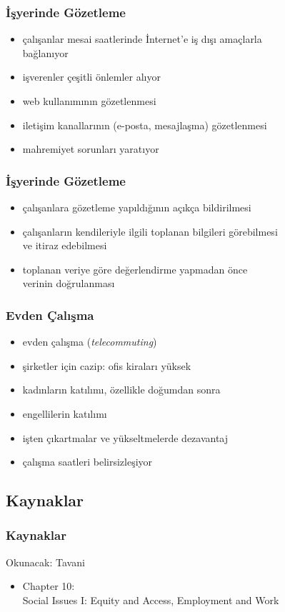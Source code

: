 \documentclass[dvipsnames]{beamer}
\theoremstyle{plain}
\begin{document}
\begin{frame}
  \frametitle{İşyerinde Gözetleme}

  \begin{itemize}
    \item çalışanlar mesai saatlerinde İnternet'e iş dışı amaçlarla\\
      bağlanıyor

    \medskip
    \item işverenler çeşitli önlemler alıyor
    \smallskip
    \item web kullanımının gözetlenmesi
    \item iletişim kanallarının (e-posta, mesajlaşma) gözetlenmesi
    \item mahremiyet sorunları yaratıyor
  \end{itemize}
\end{frame}

\begin{frame}
  \frametitle{İşyerinde Gözetleme}

  \begin{itemize}
    \item çalışanlara gözetleme yapıldığının açıkça bildirilmesi
    \item çalışanların kendileriyle ilgili toplanan bilgileri görebilmesi\\
      ve itiraz edebilmesi
    \item toplanan veriye göre değerlendirme yapmadan önce\\
      verinin doğrulanması
  \end{itemize}
\end{frame}

\begin{frame}
  \frametitle{Evden Çalışma}

  \begin{itemize}
    \item evden çalışma (\emph{telecommuting})
    \item şirketler için cazip: ofis kiraları yüksek

    \medskip
    \item kadınların katılımı, özellikle doğumdan sonra
    \item engellilerin katılımı

    \pause
    \medskip
    \item işten çıkartmalar ve yükseltmelerde dezavantaj
    \item çalışma saatleri belirsizleşiyor
  \end{itemize}
\end{frame}

\subsection*{Kaynaklar}

\begin{frame}
  \frametitle{Kaynaklar}

  \begin{block}{Okunacak: Tavani}
    \begin{itemize}
      \item Chapter 10:\\
        \alert{Social Issues I: Equity and Access, Employment and Work}
    \end{itemize}
  \end{block}
\end{frame}
\end{document}
